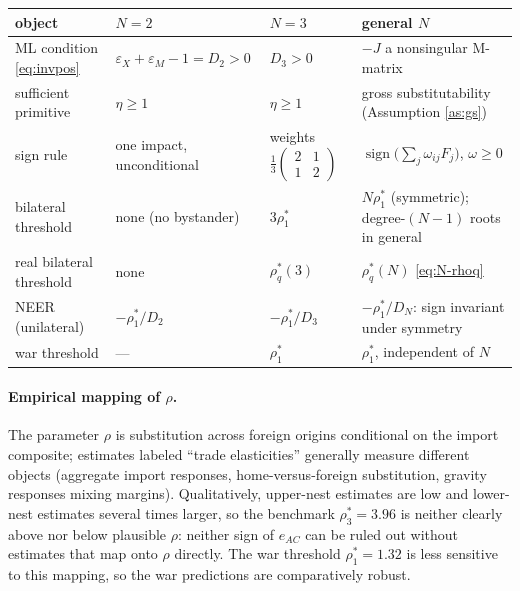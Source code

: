 \documentclass[11pt]{article}
\begin{document}
\begin{center}
\begin{tabular}{p{3.6cm}p{3.0cm}p{3.4cm}p{4.2cm}}
\toprule
object & $N = 2$ & $N = 3$ & general $N$ \\
\midrule
ML condition \eqref{eq:invpos} & $\varepsilon_X + \varepsilon_M - 1 = D_2 > 0$ & $D_3 > 0$ & $-J$ a nonsingular M-matrix \\[3pt]
sufficient primitive & $\eta \geq 1$ & $\eta \geq 1$ & gross substitutability (Assumption \ref{as:gs}) \\[3pt]
sign rule & one impact, unconditional & weights $\tfrac{1}{3}\left(\begin{smallmatrix} 2 & 1 \\ 1 & 2\end{smallmatrix}\right)$ & $\operatorname{sign}\big(\sum_j \omega_{ij}F_j\big)$, $\omega \geq 0$ \\[3pt]
bilateral threshold & none (no bystander) & $3\rho_1^*$ & $N\rho_1^*$ (symmetric); degree-$(N-1)$ roots in general \\[3pt]
real bilateral threshold & none & $\rho_q^*(3)$ & $\rho_q^*(N)$ \eqref{eq:N-rhoq} \\[3pt]
NEER (unilateral) & $-\rho_1^*/D_2$ & $-\rho_1^*/D_3$ & $-\rho_1^*/D_N$: sign invariant under symmetry \\[3pt]
war threshold & --- & $\rho_1^*$ & $\rho_1^*$, independent of $N$ \\
\bottomrule
\end{tabular}
\end{center}

\paragraph{Empirical mapping of $\rho$.} The parameter $\rho$ is substitution across foreign origins conditional on the import composite; estimates labeled ``trade elasticities'' generally measure different objects (aggregate import responses, home-versus-foreign substitution, gravity responses mixing margins). Qualitatively, upper-nest estimates are low and lower-nest estimates several times larger, so the benchmark $\rho_3^* = 3.96$ is neither clearly above nor below plausible $\rho$: neither sign of $e_{AC}$ can be ruled out without estimates that map onto $\rho$ directly. The war threshold $\rho_1^* = 1.32$ is less sensitive to this mapping, so the war predictions are comparatively robust.
\end{document}
